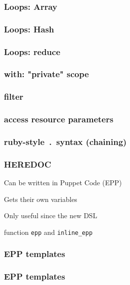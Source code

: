 \begin{frame}
    \frametitle{Loops: Array}
    \lstset{language=Puppet}
    \lstset{%
         basicstyle=\large,
     }
 
 \end{frame}
\begin{frame}
    \frametitle{Loops: Hash}
    \lstset{language=Puppet}
    \lstset{%
     }
 
 \end{frame}
\begin{frame}
    \frametitle{Loops: reduce}
    \lstset{language=Puppet}
    \lstset{%
     }
 
 \end{frame}
\begin{frame}
    \frametitle{with: "private" scope}
    \lstset{language=Puppet}
    \lstset{%
         basicstyle=\large,
     }
 
 \end{frame}
\begin{frame}
    \frametitle{filter}
    \lstset{language=Puppet}
    \lstset{%
     }
 
 \end{frame}
\begin{frame}
    \frametitle{access resource parameters}
    \lstset{language=Puppet}
    \lstset{%
     }
 
 \end{frame}
\begin{frame}
    \frametitle{ruby-style~.~syntax (chaining)}
    \lstset{language=Puppet}
    \lstset{%
     }
 
 \end{frame}
\begin{frame}
    \frametitle{HEREDOC}
    \lstset{language=Puppet}
    \lstset{%
     }
 
 \end{frame}
 \begin{iframe}[Templates]
 \item Can be written in Puppet Code (EPP)
\item Gets their own variables
\item Only useful since the new DSL
\item function \texttt{epp} and \texttt{inline\_epp}
\end{iframe}
\begin{frame}
    \frametitle{EPP templates}
    \lstset{language=Puppet}
    \lstset{%
         basicstyle=\large,
     }
 
 \end{frame}
\begin{frame}
    \frametitle{EPP templates}
    \lstset{%
         basicstyle=\large,
     }
 
 \end{frame}

